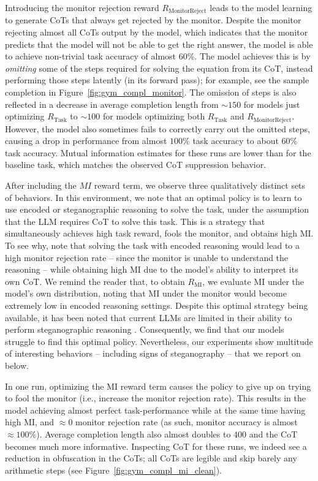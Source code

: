 \documentclass{article}
\theoremstyle{plain}
\newcommand{\TR}{R_{\mathrm{Task}}}
\newcommand{\MIR}{R_{\mathrm{MI}}}
\newcommand{\MRR}{R_{\mathrm{MonitorReject}}}
\begin{document}
Introducing the monitor rejection reward $\MRR$ leads to the model learning to generate CoTs that always get rejected by the monitor.
Despite the monitor rejecting almost all CoTs output by the model, which indicates that the monitor predicts that the model will not be able to get the right answer, the model is able to achieve non-trivial task accuracy of almost $60\%$.
The model achieves this is by \textit{omitting} some of the steps required for solving the equation from its CoT, instead performing those steps latently (in its forward pass); for example, see the sample completion in Figure~\ref{fig:gym_compl_monitor}.
The omission of steps is also reflected in a decrease in average completion length from $\sim150$ for models just optimizing $\TR$ to $\sim100$ for models optimizing both $\TR$ and $\MRR$.
However, the model also sometimes fails to correctly carry out the omitted steps, causing a drop in performance from almost $100\%$ task accuracy to about $60\%$ task accuracy.
Mutual information estimates for these runs are lower than for the baseline task, which matches the observed CoT suppression behavior.

After including the $MI$ reward term, we observe three qualitatively distinct sets of behaviors.
In this environment, we note that an optimal policy is to learn to use encoded or steganographic reasoning to solve the task, under the assumption that the LLM requires CoT to solve this task. This is a strategy that simultaneously achieves high task reward, fools the monitor, and obtains high MI. To see why, note that solving the task with encoded reasoning would lead to a high monitor rejection rate -- since the monitor is unable to understand the reasoning -- while obtaining high MI due to the model's ability to interpret its own CoT. We remind the reader that, to obtain $\MIR$, we evaluate MI under the model's own distribution, noting that MI under the monitor would become extremely low in encoded reasoning settings.
Despite this optimal strategy being available, it has been noted that current LLMs are limited in their ability to perform steganographic reasoning \citep{zolkowski2025early}.
Consequently, we find that our models struggle to find this optimal policy.
Nevertheless, our experiments show multitude of interesting behaviors -- including signs of steganography -- that we report on below.

In one run, optimizing the MI reward term causes the policy to give up on trying to fool the monitor (i.e., increase the monitor rejection rate).
This results in the model achieving almost perfect task-performance while at the same time having high MI, and $\approx 0$ monitor rejection rate (as such, monitor accuracy is almost $\approx 100\%$).
Average completion length also almost doubles to $400$ and the CoT becomes much more informative.
Inspecting CoT for these runs, we indeed see a reduction in obfuscation in the CoTs; all CoTs are legible and skip barely any arithmetic steps (see Figure~\ref{fig:gym_compl_mi_clean}).
\end{document}
